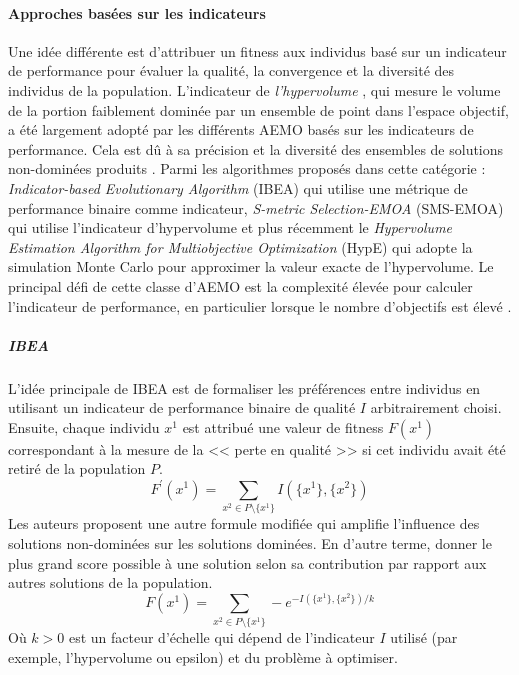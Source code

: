 \paragraph{Approches basées sur les indicateurs}
Une idée différente est d'attribuer un fitness aux individus basé sur un indicateur de performance pour évaluer la qualité, la convergence et la diversité des individus de la population. L'indicateur de \textit{l'hypervolume} \cite{Zitzler99b}, qui mesure le volume de la portion faiblement dominée par un ensemble de point dans l’espace objectif, a été largement adopté par les différents AEMO basés sur les indicateurs de performance. Cela est dû à sa précision et la diversité des ensembles de solutions non-dominées produits \cite{Wagner07}. Parmi les algorithmes proposés dans cette catégorie : \textit{Indicator-based Evolutionary Algorithm} (IBEA) \cite{Zitzler04} qui utilise une métrique de performance binaire comme indicateur, \textit{S-metric Selection-EMOA} (SMS-EMOA) \cite{Beume07} qui utilise l'indicateur d'hypervolume et plus récemment le \textit{Hypervolume Estimation Algorithm for Multiobjective Optimization} (HypE) \cite{Bader11} qui adopte la simulation Monte Carlo pour approximer la valeur exacte de l'hypervolume. Le principal défi de cette classe d'AEMO est la complexité élevée pour calculer l'indicateur de performance, en particulier lorsque le nombre d'objectifs est élevé \cite{Beume09}.

\subparagraph{IBEA}
L’idée principale de IBEA \cite{Zitzler04} est de formaliser les préférences entre individus en utilisant un indicateur de performance binaire de qualité $I$ arbitrairement choisi. Ensuite, chaque individu $x^1$ est attribué une valeur de fitness $F(x^1)$ correspondant à la mesure de la << perte en qualité >> si cet individu avait été retiré de la population $P$.
\begin{equation}
 F^\prime(x^1) = \sum_{x^2 \in P\setminus \{x^1\}} I(\{x^1\},\{x^2\})
\end{equation} 
Les auteurs proposent une autre formule modifiée qui amplifie l’influence des solutions non-dominées sur les solutions dominées. En d'autre terme, donner le plus grand score possible à une solution selon sa contribution par rapport aux autres solutions de la population.
\begin{equation}
 F(x^1) = \sum_{x^2 \in P\setminus \{x^1\}} - e^{-I(\{x^1\},\{x^2\})/k}
\end{equation}
Où $k > 0$ est un facteur d'échelle qui dépend de l’indicateur $I$ utilisé (par exemple, l'hypervolume ou epsilon) et du problème à optimiser.

